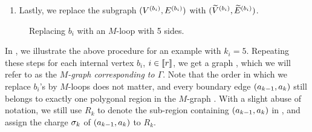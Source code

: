 \begin{definition}
\begin{enumerate}
\item Lastly, we replace the subgraph $(V^{\left({b_i}\right)}, E^{\left({b_i}\right)})$ with $(\widetilde{V}^{\left({b_i}\right)}, \widetilde{E}^{\left({b_i}\right)})$.
\end{enumerate}

  \begin{figure}[h]
    \centering
    \caption{Replacing $b_i$ with an $M$-loop with 5 sides.}\label{Fig:Mloop}
  \end{figure}

  In , we illustrate the above procedure for an example with $k_i=5$. Repeating these steps for each internal vertex $b_i$, $i\in\llbracket{r}\rrbracket$, we get a graph , which we will refer to as the \emph{$M$-graph corresponding to $\Gamma$}. Note that the order in which we replace $b_i$'s by $M$-loops does not matter, and every boundary edge $\left({a_{k-1}, a_k}\right)$ still belongs to exactly one polygonal region in the $M$-graph . 
With a slight abuse of notation, we still use $R_k$ to denote the sub-region containing $\left({a_{k-1}, a_k}\right)$ in , and assign the charge $\sigma_k$ of $\left({a_{k-1}, a_k}\right)$ to $R_k$. 
      
      

\end{definition}
